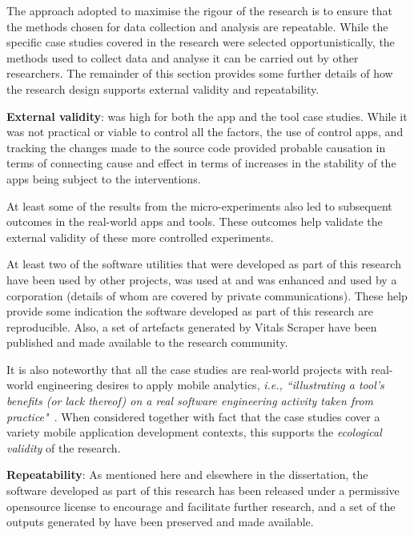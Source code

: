 The approach adopted to maximise the rigour of the research is to ensure that the methods chosen for data collection and analysis are repeatable. While the specific case studies covered in the research were selected opportunistically, the methods used to collect data and analyse it can be carried out by other researchers. The remainder of this section provides some further details of how the research design supports external validity and repeatability.

\textbf{External validity}: was high for both the app and the tool case studies. While it was not practical or viable to control all the factors, the use of control apps, and tracking the changes made to the source code provided probable causation in terms of connecting cause and effect in terms of increases in the stability of the apps being subject to the interventions.

At least some of the results from the micro-experiments also led to subsequent outcomes in the real-world apps and tools. These outcomes help validate the external validity of these more controlled experiments. 

At least two of the software utilities that were developed as part of this research have been used by other projects,  was used at  and  was enhanced and used by a corporation (details of whom are covered by private communications). These help provide some indication the software developed as part of this research are reproducible. Also, a set of artefacts generated by Vitals Scraper have been published and made available to the research community. 

 It is also noteworthy that all the case studies  are real-world projects with real-world engineering desires to apply mobile analytics, \emph{i.e., ``illustrating a tool’s benefits (or lack thereof) on a real software engineering activity taken from practice"}~. When considered together with fact that the case studies cover a variety mobile application development contexts, this supports the \emph{ecological validity} of the research.

\textbf{Repeatability}:
As mentioned here and elsewhere in the dissertation, the software developed as part of this research has been released under a permissive opensource license to encourage and facilitate further research, and a set of the outputs generated by  have been preserved and made available.


